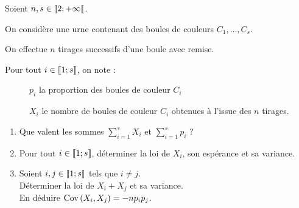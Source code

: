\begin{corr}
\end{corr}

\begin{exo}[Exercice 9]
Soient \(n,s\in\left\llbracket2;+\infty\right\llbracket\).

On considère une urne contenant des boules de couleurs \(C_1,\dots,C_s\).

On effectue \(n\) tirages successifs d'une boule avec remise.

Pour tout \(i\in\left\llbracket1;s\right\rrbracket\), on note : \begin{description}
    \item[] \(p_i\) la proportion des boules de couleur \(C_i\)
    \item[] \(X_i\) le nombre de boules de couleur \(C_i\) obtenues à l'issue des \(n\) tirages.
\end{description}

\begin{enumerate}
    \item Que valent les sommes \(\sum_{i=1}^sX_i\) et \(\sum_{i=1}^sp_i\) ? \\
    \item Pour tout \(i\in\left\llbracket1;s\right\rrbracket\), déterminer la loi de \(X_i\), son espérance et sa variance. \\
    \item Soient \(i,j\in\left\llbracket1;s\right\rrbracket\) tels que \(i\not=j\). \\ Déterminer la loi de \(X_i+X_j\) et sa variance. \\ En déduire \(\operatorname{Cov}\left(X_i,X_j\right)=-np_ip_j\).
\end{enumerate}
\end{exo}

\begin{corr}
\end{corr}

